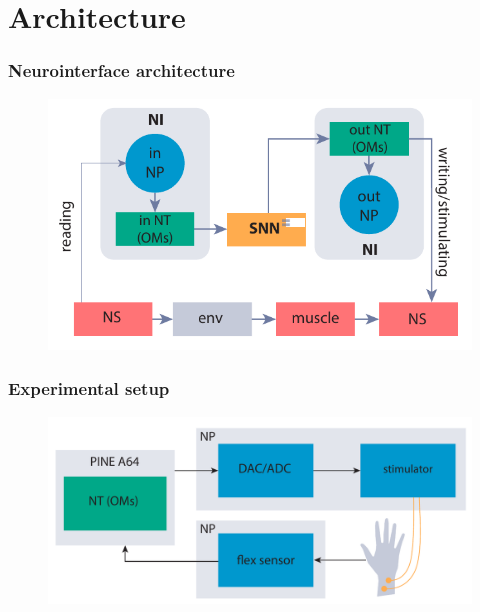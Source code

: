 \documentclass[12pt, aspectratio=169]{beamer}
\begin{document}


\section{Architecture}
\begin{frame}
  \frametitle{Neurointerface architecture}
  \begin{figure}
    \includegraphics[width=0.9\linewidth]{NI_h}
  \end{figure}
\end{frame}

\begin{frame}
  \frametitle{Experimental setup}
  \begin{figure}
    \includegraphics[width=0.9\linewidth]{hld_exp}
  \end{figure}
\end{frame}
\end{document}
